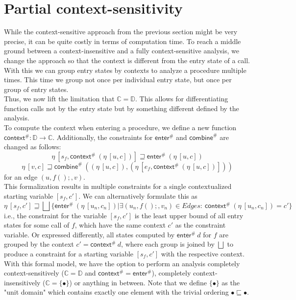   \section{Partial context-sensitivity}\label{sec:partialCtxSens}
    While the context-sensitive approach from the previous section might be very precise, it can be quite costly in terms of computation time. To reach a middle ground between a context-insensitive and a fully context-sensitive analysis, we change the approach so that the context is different from the entry state of a call. With this we can group entry states by contexts to analyze a procedure multiple times. This time we group not once per individual entry state, but once per group of entry states.\\
    Thus, we now lift the limitation that $\mathbb{C} = \mathbb{D}$. This allows for differentiating function calls not by the entry state but by something different defined by the analysis.\\
    To compute the context when entering a procedure, we define a new function $\textsf{context}^{\#}: \mathbb{D} \rightarrow \mathbb{C}$. Additionally, the constraints for $\textsf{enter}^{\#}$ and $\textsf{combine}^{\#}$ are changed as follows:
    \[\eta\ [s_f, \textsf{context}^{\#}\ (\eta\ [u, c])] \sqsupseteq \textsf{enter}^{\#}\ (\eta\ [u, c]) \]
    \[\eta\ [v, c] \sqsupseteq \textsf{combine}^{\#}\ ((\eta\ [u, c]), (\eta\ [e_f, \textsf{context}^{\#}\ (\eta\ [u, c])])) \]
    for an edge $(u, f();, v)$.\\
    This formalization results in multiple constraints for a single contextualized starting variable $[s_f, c']$. We can alternatively formulate this as
    \[\eta\ [s_f, c'] \sqsupseteq \bigsqcup \{\textsf{enter}^{\#}\ (\eta\ [u_n, c_n]) | \exists (u_n, f();, v_n) \in Edges:\ \textsf{context}^{\#}\ (\eta\ [u_n, c_n]) = c' \} \]
    i.e., the constraint for the variable $[s_f, c']$ is the least upper bound of all entry states for some call of $f$, which have the same context $c'$ as the constraint variable. Or expressed differently, all states computed by $\textsf{enter}^{\#}\ d$ for $f$ are grouped by the context $c' = \textsf{context}^{\#}\ d$, where each group is joined by $\bigsqcup$ to produce a constraint for a starting variable $[s_f, c']$ with the respective context.\\ 
    With this formal model, we have the option to perform an analysis completely context-sensitively ($\mathbb{C} = \mathbb{D}$ and $\textsf{context}^{\#} = \textsf{enter}^{\#}$), completely context-insensitively ($\mathbb{C} = \{\bullet\}$) or anything in between. Note that we define $\{\bullet\}$ as the "unit domain" which contains exactly one element with the trivial ordering $\bullet \sqsubseteq \bullet$.\\
